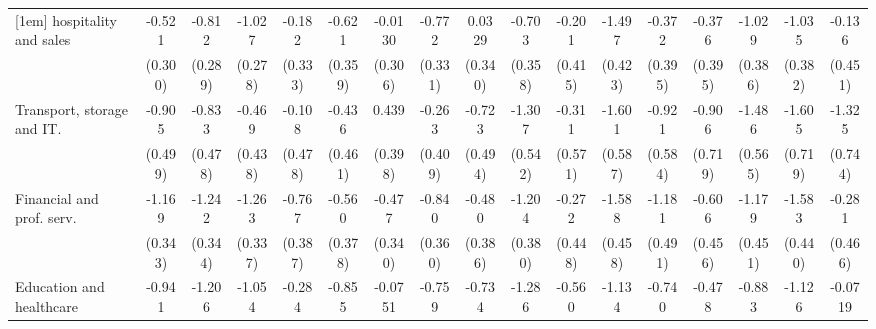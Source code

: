 {\begin{tabular}{l*{16}{c}}
[1em]
hospitality and sales&      -0.521         &      -0.812\sym{**} &      -1.027\sym{***}&      -0.182         &      -0.621         &     -0.0130         &      -0.772\sym{*}  &      0.0329         &      -0.703\sym{*}  &      -0.201         &      -1.497\sym{***}&      -0.372         &      -0.376         &      -1.029\sym{**} &      -1.035\sym{**} &      -0.136         \\
                    &     (0.300)         &     (0.289)         &     (0.278)         &     (0.333)         &     (0.359)         &     (0.306)         &     (0.331)         &     (0.340)         &     (0.358)         &     (0.415)         &     (0.423)         &     (0.395)         &     (0.395)         &     (0.386)         &     (0.382)         &     (0.451)         \\
[1em]
Transport, storage and IT.&      -0.905         &      -0.833         &      -0.469         &      -0.108         &      -0.436         &       0.439         &      -0.263         &      -0.723         &      -1.307\sym{*}  &      -0.311         &      -1.601\sym{**} &      -0.921         &      -0.906         &      -1.486\sym{**} &      -1.605\sym{*}  &      -1.325         \\
                    &     (0.499)         &     (0.478)         &     (0.438)         &     (0.478)         &     (0.461)         &     (0.398)         &     (0.409)         &     (0.494)         &     (0.542)         &     (0.571)         &     (0.587)         &     (0.584)         &     (0.719)         &     (0.565)         &     (0.719)         &     (0.744)         \\
[1em]
Financial and prof. serv.&      -1.169\sym{***}&      -1.242\sym{***}&      -1.263\sym{***}&      -0.767\sym{*}  &      -0.560         &      -0.477         &      -0.840\sym{*}  &      -0.480         &      -1.204\sym{**} &      -0.272         &      -1.588\sym{***}&      -1.181\sym{*}  &      -0.606         &      -1.179\sym{**} &      -1.583\sym{***}&      -0.281         \\
                    &     (0.343)         &     (0.344)         &     (0.337)         &     (0.387)         &     (0.378)         &     (0.340)         &     (0.360)         &     (0.386)         &     (0.380)         &     (0.448)         &     (0.458)         &     (0.491)         &     (0.456)         &     (0.451)         &     (0.440)         &     (0.466)         \\
[1em]
Education and healthcare&      -0.941\sym{**} &      -1.206\sym{***}&      -1.054\sym{**} &      -0.284         &      -0.855\sym{*}  &     -0.0751         &      -0.759\sym{*}  &      -0.734         &      -1.286\sym{***}&      -0.560         &      -1.134\sym{**} &      -0.740         &      -0.478         &      -0.883\sym{*}  &      -1.126\sym{**} &     -0.0719         \\

\end{tabular}}
